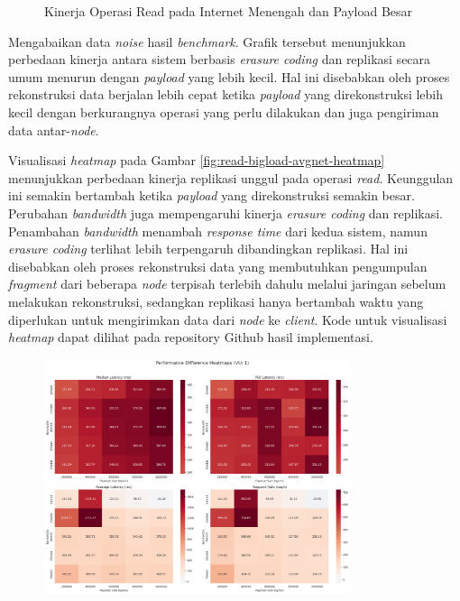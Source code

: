 \begin{enumerate}
\begin{figure}[ht]
    \caption{Kinerja Operasi Read pada Internet Menengah dan Payload Besar}
    \label{fig:read-bigload-avgnet}
  \end{figure}

  Mengabaikan data \textit{noise} hasil \textit{benchmark}. Grafik tersebut menunjukkan perbedaan kinerja antara sistem berbasis \textit{erasure coding} dan replikasi secara umum menurun dengan \textit{payload} yang lebih kecil. Hal ini disebabkan oleh proses rekonstruksi data berjalan lebih cepat ketika \textit{payload} yang direkonstruksi lebih kecil dengan berkurangnya operasi yang perlu dilakukan dan juga pengiriman data antar-\textit{node}.

  Visualisasi \textit{heatmap} pada Gambar \ref{fig:read-bigload-avgnet-heatmap} menunjukkan perbedaan kinerja replikasi unggul pada operasi \textit{read}. Keunggulan ini semakin bertambah ketika \textit{payload} yang direkonstruksi semakin besar. Perubahan \textit{bandwidth} juga mempengaruhi kinerja \textit{erasure coding} dan replikasi. Penambahan \textit{bandwidth} menambah \textit{response time} dari kedua sistem, namun \textit{erasure coding} terlihat lebih terpengaruh dibandingkan replikasi. Hal ini disebabkan oleh proses rekonstruksi data yang membutuhkan pengumpulan \textit{fragment} dari beberapa \textit{node} terpisah terlebih dahulu melalui jaringan sebelum melakukan rekonstruksi, sedangkan replikasi hanya bertambah waktu yang diperlukan untuk mengirimkan data dari \textit{node} ke \textit{client}. Kode untuk visualisasi \textit{heatmap} dapat dilihat pada repository Github hasil implementasi.

  \begin{figure}[ht]
    \centering
    \includegraphics[width=0.8\textwidth]{resources/chapter-4/read_bigload_avgnet_heatmap.png}


\end{figure}
\end{enumerate}
